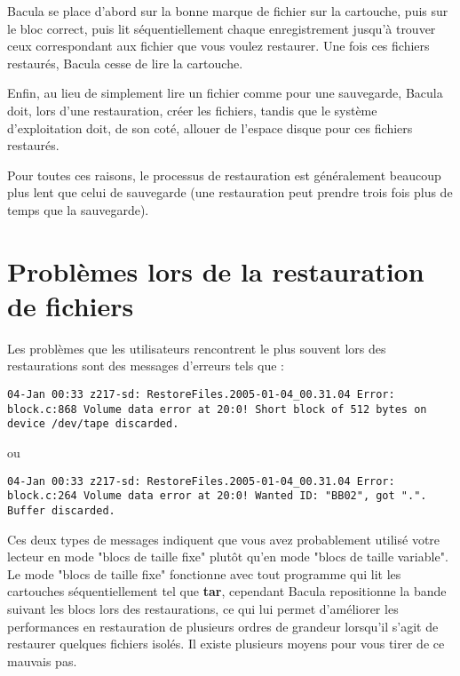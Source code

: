 Bacula se place d'abord sur la bonne marque de fichier sur la cartouche, puis 
sur le bloc correct, puis lit s\'equentiellement chaque enregistrement jusqu'\`a 
trouver ceux correspondant aux fichier que vous voulez restaurer. Une fois ces 
fichiers restaur\'es, Bacula cesse de lire la cartouche.

Enfin, au lieu de simplement lire un fichier comme pour une sauvegarde, Bacula 
doit, lors d'une restauration, cr\'eer les fichiers, tandis que le syst\`eme 
d'exploitation doit, de son cot\'e, allouer de l'espace disque pour ces fichiers 
restaur\'es.

Pour toutes ces raisons, le processus de restauration est g\'en\'eralement beaucoup 
plus lent que celui de sauvegarde (une restauration peut prendre trois fois 
plus de temps que la sauvegarde).

\section{Probl\`emes lors de la restauration de fichiers}

Les probl\`emes que les utilisateurs rencontrent le plus souvent lors des restaurations 
sont des messages d'erreurs tels que :

\footnotesize
\begin{verbatim}
04-Jan 00:33 z217-sd: RestoreFiles.2005-01-04_00.31.04 Error:
block.c:868 Volume data error at 20:0! Short block of 512 bytes on
device /dev/tape discarded.
\end{verbatim}
\normalsize

ou 

\footnotesize
\begin{verbatim}
04-Jan 00:33 z217-sd: RestoreFiles.2005-01-04_00.31.04 Error:
block.c:264 Volume data error at 20:0! Wanted ID: "BB02", got ".".
Buffer discarded.
\end{verbatim}
\normalsize

Ces deux types de messages indiquent que vous avez probablement utilis\'e votre 
lecteur en mode "blocs de taille fixe" plut\^ot qu'en mode "blocs de taille 
variable". Le mode "blocs de taille fixe" fonctionne avec tout programme 
qui lit les cartouches s\'equentiellement tel que {\bf tar}, cependant Bacula 
repositionne la bande suivant les blocs lors des restaurations, ce qui lui 
permet d'am\'eliorer les performances en restauration de plusieurs ordres 
de grandeur lorsqu'il s'agit de restaurer quelques fichiers isol\'es. Il existe 
plusieurs moyens pour vous tirer de ce mauvais pas.

